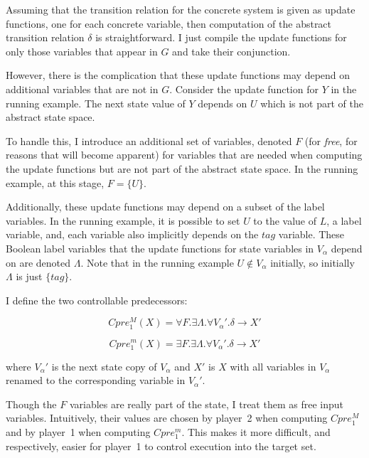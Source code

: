 Assuming that the transition relation for the concrete system is given as update functions, one for each concrete variable, then computation of the abstract transition relation $\delta$ is straightforward. I just compile the update functions for only those variables that appear in $G$ and take their conjunction.

However, there is the complication that these update functions may depend on additional variables that are not in $G$. Consider the update function for $Y$ in the running example. The next state value of $Y$ depends on $U$ which is not part of the abstract state space.

To handle this, I introduce an additional set of variables, denoted $F$ (for \emph{free}, for reasons that will become apparent) for variables that are needed when computing the update functions but are not part of the abstract state space. In the running example, at this stage, $F=\{U\}$.

Additionally, these update functions may depend on a subset of the label variables. In the running example, it is possible to set $U$ to the value of $L$, a label variable, and, each variable also implicitly depends on the $tag$ variable. These Boolean label variables that the update functions for state variables in $V_\alpha$ depend on are denoted $\Lambda$. Note that in the running example $U \notin V_\alpha$ initially, so initially $\Lambda$ is just $\{tag\}$.

I define the two controllable predecessors:

\begin{equation}
    \label{eqn:symb_cpre_M}
    Cpre_1^M(X) = \forall F. \exists \Lambda. \forall V_\alpha'. \delta \rightarrow X'
\end{equation}

\begin{equation}
    \label{eqn:symb_cpre_m}
    Cpre_1^m(X) = \exists F. \exists \Lambda. \forall V_\alpha'. \delta \rightarrow X'
\end{equation}

\noindent where $V_\alpha'$ is the next state copy of $V_\alpha$ and $X'$ is $X$ with all variables in $V_\alpha$ renamed to the corresponding variable in $V_\alpha'$.

Though the $F$ variables are really part of the state, I treat them as free input variables. Intuitively, their values are chosen by player~2 when computing $Cpre_1^M$ and by player~1 when computing $Cpre_1^m$. This makes it more difficult, and respectively, easier for player~1 to control execution into the target set.

